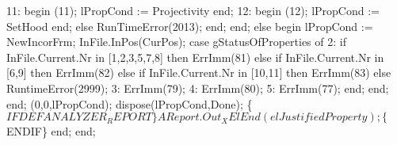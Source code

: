                11: begin (11); lPropCond := Projectivity end;
               12: begin (12); lPropCond := SetHood end;
            else RunTimeError(2013);
            end;
            end;
      else
      begin lPropCond := NewIncorFrm;
      InFile.InPos(CurPos);
      case gStatusOfProperties of
         2: if InFile.Current.Nr in [1,2,3,5,7,8] then ErrImm(81) else
               if InFile.Current.Nr in [6,9] then ErrImm(82) else
                  if InFile.Current.Nr in [10,11] then ErrImm(83) else RuntimeError(2999);
         3: ErrImm(79);
         4: ErrImm(80);
         5: ErrImm(77);
      end;
      end;
      end;
      (0,0,lPropCond);
      dispose(lPropCond,Done);
      \{$IFDEF ANALYZER_REPORT\}
      AReport.Out_XElEnd(elJustifiedProperty);
      \{$ENDIF\}
   end;
end;
\eatline
